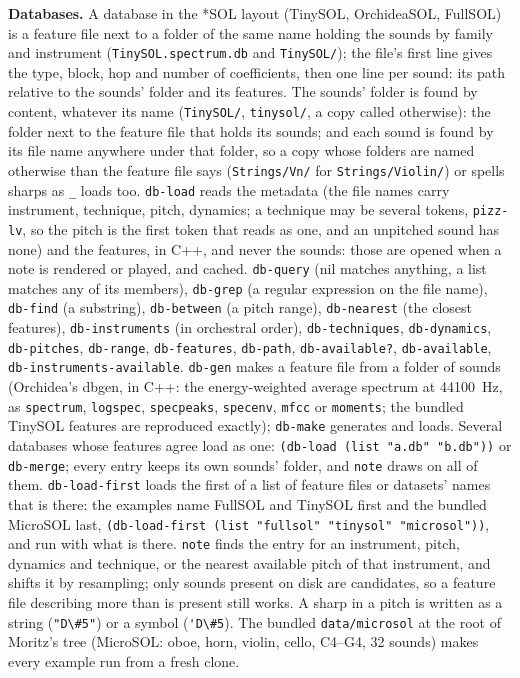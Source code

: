 \documentclass[11pt,a4paper]{article}
\newcommand{\musil}[1]{\lstinline[style=musilinline]{#1}}
\begin{document}
\textbf{Databases.} A database in the *SOL layout (TinySOL, OrchideaSOL, FullSOL) is a
feature file next to a folder of the same name holding the sounds by family and instrument
(\texttt{TinySOL.spectrum.db} and \texttt{TinySOL/}); the file's first line gives the type,
block, hop and number of coefficients, then one line per sound: its path relative to the
sounds' folder and its features. The sounds' folder is found by content, whatever its name
(\texttt{TinySOL/}, \texttt{tinysol/}, a copy called otherwise): the folder next to the
feature file that holds its sounds; and each sound is found by its file name anywhere under
that folder, so a copy whose folders are named otherwise than the feature file says
(\texttt{Strings/Vn/} for \texttt{Strings/Violin/}) or spells sharps as \texttt{\_} loads
too. \musil{db-load} reads the metadata (the
file names carry instrument, technique, pitch, dynamics; a technique may be several tokens,
\texttt{pizz-lv}, so the pitch is the first token that reads as one, and an unpitched sound
has none) and the features, in C++, and never the sounds: those are opened when a note is rendered or played, and cached.
\musil{db-query} (nil matches anything, a list matches any of its members), \musil{db-grep}
(a regular expression on the file name), \musil{db-find} (a substring), \musil{db-between}
(a pitch range), \musil{db-nearest} (the closest features), \musil{db-instruments} (in
orchestral order), \musil{db-techniques}, \musil{db-dynamics}, \musil{db-pitches},
\musil{db-range}, \musil{db-features}, \musil{db-path}, \musil{db-available?},
\musil{db-available}, \musil{db-instruments-available}. \musil{db-gen} makes a feature file
from a folder of sounds (Orchidea's dbgen, in C++: the energy-weighted average spectrum at
44100~Hz, as \texttt{spectrum}, \texttt{logspec}, \texttt{specpeaks}, \texttt{specenv},
\texttt{mfcc} or \texttt{moments}; the bundled TinySOL features are reproduced exactly);
\musil{db-make} generates and loads. Several databases whose features agree load as one:
\musil{(db-load (list "a.db" "b.db"))} or \musil{db-merge}; every entry keeps its own
sounds' folder, and \musil{note} draws on all of them. \musil{db-load-first} loads the first
of a list of feature files or datasets' names that is there: the examples name FullSOL and TinySOL
first and the bundled MicroSOL last, \musil{(db-load-first (list "fullsol" "tinysol" "microsol"))},
and run with what is there. \musil{note} finds the entry
for an instrument, pitch, dynamics and technique, or the nearest available pitch of that
instrument, and shifts it by resampling; only sounds present on disk are candidates, so a
feature file describing more than is present still works. A sharp in a pitch is written as
a string (\musil{"D\#5"}) or a symbol (\musil{'D\#5}). The bundled
\texttt{data/microsol} at the root of Moritz's tree (MicroSOL: oboe, horn, violin, cello, C4--G4, 32 sounds)
makes every example run from a fresh clone.
\end{document}
